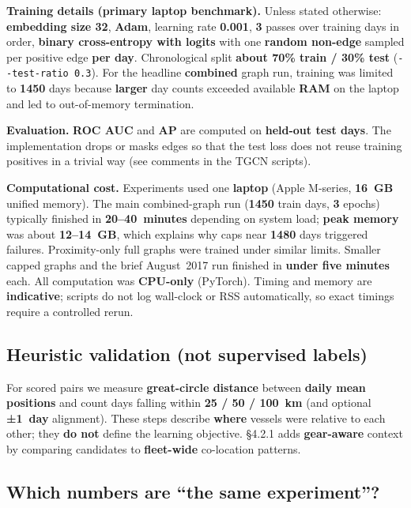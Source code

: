 \documentclass[
]{article}
\begin{document}
\textbf{Training details (primary laptop benchmark).} Unless stated
otherwise: \textbf{embedding size 32}, \textbf{Adam}, learning rate
\textbf{0.001}, \textbf{3} passes over training days in order,
\textbf{binary cross-entropy with logits} with one \textbf{random
non-edge} sampled per positive edge \textbf{per day}. Chronological
split \textbf{about 70\% train / 30\% test}
(\texttt{-\/-test-ratio\ 0.3}). For the headline \textbf{combined} graph
run, training was limited to \textbf{1450} days because \textbf{larger}
day counts exceeded available \textbf{RAM} on the laptop and led to
out-of-memory termination.

\textbf{Evaluation.} \textbf{ROC AUC} and \textbf{AP} are computed on
\textbf{held-out test days}. The implementation drops or masks edges so
that the test loss does not reuse training positives in a trivial way
(see comments in the TGCN scripts).

\textbf{Computational cost.} Experiments used one \textbf{laptop} (Apple
M-series, \textbf{16~GB} unified memory). The main combined-graph run
(\textbf{1450} train days, \textbf{3} epochs) typically finished in
\textbf{20--40~minutes} depending on system load; \textbf{peak memory}
was about \textbf{12--14~GB}, which explains why caps near \textbf{1480}
days triggered failures. Proximity-only full graphs were trained under
similar limits. Smaller capped graphs and the brief August~2017 run
finished in \textbf{under five minutes} each. All computation was
\textbf{CPU-only} (PyTorch). Timing and memory are \textbf{indicative};
scripts do not log wall-clock or RSS automatically, so exact timings
require a controlled rerun.

\subsection{Heuristic validation (not supervised
labels)}\label{heuristic-validation-not-supervised-labels}

For scored pairs we measure \textbf{great-circle distance} between
\textbf{daily mean positions} and count days falling within \textbf{25 /
50 / 100~km} (and optional \textbf{±1~day} alignment). These steps
describe \textbf{where} vessels were relative to each other; they
\textbf{do not} define the learning objective. §4.2.1 adds
\textbf{gear-aware} context by comparing candidates to
\textbf{fleet-wide} co-location patterns.

\subsection{Which numbers are ``the same
experiment''?}\label{which-numbers-are-the-same-experiment}
\end{document}
